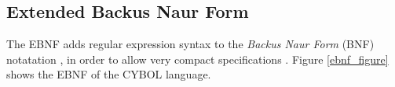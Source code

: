 %
%
%
%
%
%

\subsection{Extended Backus Naur Form}
\label{extended_backus_naur_form_heading}

The EBNF adds regular expression syntax to the \emph{Backus Naur Form} (BNF)
notatation \cite{naur}, in order to allow very compact specifications
\cite{kuhn}. Figure \ref{ebnf_figure} shows the EBNF of the CYBOL language.

